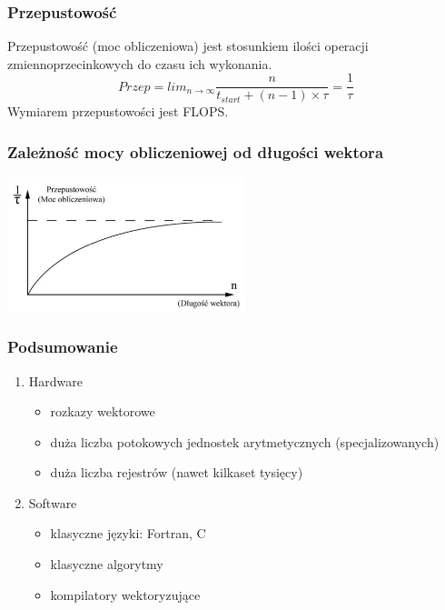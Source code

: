 		\subsubsection{Przepustowość}
			Przepustowość (moc obliczeniowa) jest stosunkiem ilości operacji zmiennoprzecinkowych do czasu ich wykonania.
			$$Przep=lim_{n \to \infty}\frac{n}{t_{start}+(n-1)\times\tau}=\frac{1}{\tau}$$
			Wymiarem przepustowości jest FLOPS.
			
		\subsubsection{Zależność mocy obliczeniowej od długości wektora}
			\begin{center}
				\includegraphics[width=0.52\textwidth]{./images/simd01}
			\end{center}
	
		\subsubsection{Podsumowanie}
			\begin{enumerate}
				\item Hardware
				\begin{itemize}
					\item rozkazy wektorowe
					\item duża liczba potokowych jednostek arytmetycznych (specjalizowanych)
					\item duża liczba rejestrów (nawet kilkaset tysięcy)
				\end{itemize}
				\item Software
				\begin{itemize}
					\item klasyczne języki: Fortran, C
					\item klasyczne algorytmy
					\item kompilatory wektoryzujące
				\end{itemize}
			\end{enumerate}

